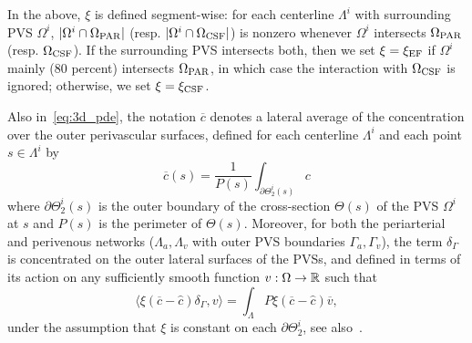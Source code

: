 In the above, $\xi$ is defined segment-wise: for each centerline $\Lambda^i$ with surrounding PVS $\Omega^i$, $|\Omega^i \cap \Omega_{\rm{PAR}}|$ (resp. $|\Omega^i \cap \Omega_{\rm{CSF}}|$) is nonzero whenever $\Omega^i$ intersects $\Omega_{\rm{PAR}}$ (resp. $\Omega_{\rm{CSF}}$). If the surrounding PVS intersects both, then we set $\xi = \xi_{\rm EF}$ if $\Omega^i$ mainly ($80$ percent) intersects $\Omega_{\rm{PAR}}$, in which case the interaction with $\Omega_{\rm{CSF}}$ is ignored; otherwise, we set $\xi = \xi_{\rm CSF}$. 
 
Also in~\eqref{eq:3d_pde}, the notation $\overline{c}$ denotes a lateral average of the concentration over the outer perivascular surfaces, defined for each centerline $\Lambda^i$ and each point $s \in \Lambda^i$ by
\begin{equation*}
  \overline{c}(s) = \frac{1}{P(s)} \int_{\partial \Theta_2^i(s)} c 
\end{equation*}
where $\partial \Theta_2^i(s)$ is the outer boundary of the cross-section $\Theta(s)$ of the PVS $\Omega^i$ at $s$ and $P(s)$ is the perimeter of $\Theta(s)$. Moreover, for both the periarterial and perivenous networks ($\Lambda_a, \Lambda_v$ with outer PVS boundaries $\Gamma_a, \Gamma_v$), the term $\delta_\Gamma$ is concentrated on the outer lateral surfaces of the PVSs, and defined in terms of its action on any sufficiently smooth function $v : \Omega \rightarrow \mathbb{R}$
such that
\begin{equation*}
  \langle \xi (\overline{c} - \hat c ) \delta_\Gamma, v \rangle =
  \int_{\Lambda} P \xi (\overline{c} - \hat c ) \overline{v}, 
\end{equation*}
under the assumption that $\xi$ is constant on each $\partial
\Theta_2^i$, see also~\cite{masri2024discontinuous}.

